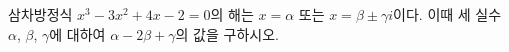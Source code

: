 삼차방정식 $x^3-3x^2+4x-2=0$의 해는 $x=\alpha$ 또는 $x=\beta\pm\gamma i$이다. 이때 세 실수 $\alpha$, $\beta$, $\gamma$에 대하여 $\alpha-2\beta+\gamma$의 값을 구하시오. 

